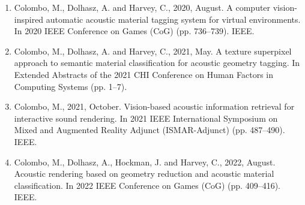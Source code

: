 \begin{enumerate}
    \item Colombo, M., Dolhasz, A. and Harvey, C., 2020, August. A computer vision-inspired automatic acoustic material tagging system for virtual environments. In 2020 IEEE Conference on Games (CoG) (pp. 736--739). IEEE.
    \item Colombo, M., Dolhasz, A. and Harvey, C., 2021, May. A texture superpixel approach to semantic material classification for acoustic geometry tagging. In Extended Abstracts of the 2021 CHI Conference on Human Factors in Computing Systems (pp. 1--7).
    \item Colombo, M., 2021, October. Vision-based acoustic information retrieval for interactive sound rendering. In 2021 IEEE International Symposium on Mixed and Augmented Reality Adjunct (ISMAR-Adjunct) (pp. 487--490). IEEE.
    \item Colombo, M., Dolhasz, A., Hockman, J. and Harvey, C., 2022, August. Acoustic rendering based on geometry reduction and acoustic material classification. In 2022 IEEE Conference on Games (CoG) (pp. 409--416). IEEE.
\end{enumerate}

